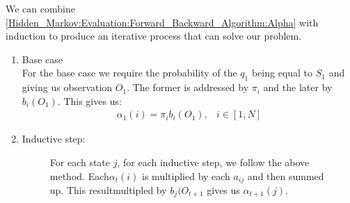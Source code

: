     We can combine \ref{Hidden_Markov:Evaluation:Forward_Backward_Algorithm:Alpha} with induction to produce an iterative process that can solve our problem.

    \begin{enumerate}[i]
        \item Base case \\
        For the base case we require the probability of the $q_1$ being equal to $S_1$ and giving us observation $O_1$. The former is addressed by $\pi_i$ and the later by $b_i(O_1)$. This gives us:
        \begin{eqnarray}
            \alpha_1(i) = \pi_i b_i(O_1), & i \in [1,N]
        \end{eqnarray}

        \item Inductive step:
        \begin{figure}
            \begin{center}
                \label{Hidden_Markov:Evaluation:Forward_Backward_Algorithm:Figure_Alpha}
                \caption{For each state $j$, for each inductive step, we follow the above method. Each$\alpha_t  (i)$ is multiplied by each $a_{ij}$ and then summed up. This resultmultipled by $b_j  (O_{t+1}$ gives us $\alpha_{t+1}(j)$.}
            \end{center}
        \end{figure}


\end{enumerate}
